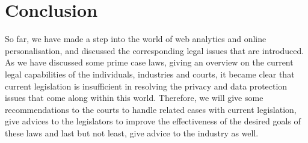 \documentclass[11pt]{article}
\newcommand{\tocheck}[1]{{\bf !?: #1 :!?}}
\begin{document}

			







\section{Conclusion}
So far, we have made a step into the world of web analytics and online personalisation, and discussed the corresponding legal issues that are introduced. As we have discussed some prime case laws, giving an overview on the current legal capabilities of the individuals, industries and courts, it became clear that current legislation is insufficient in resolving the privacy and data protection issues that come along within this world. Therefore, we will give some recommendations to the courts to handle related cases with current legislation, give advices to the legislators to improve the effectiveness of the desired goals of these laws and last but not least, give advice to the industry as well.
\end{document}
